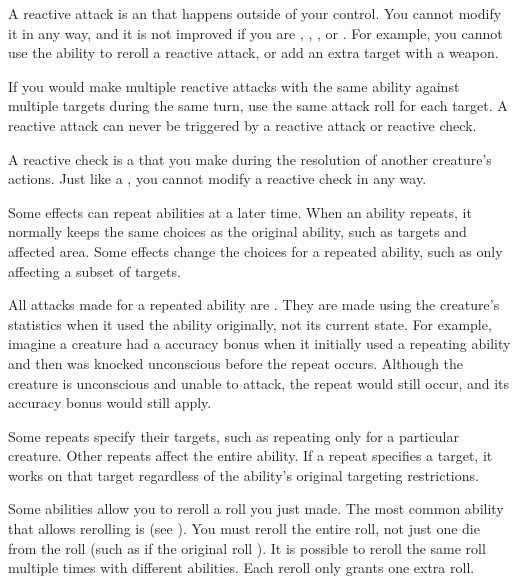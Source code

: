  A reactive attack is an  that happens outside of your control.
You cannot modify it in any way, and it is not improved if you are \empowered, \focused, \maximized, or \primed.
For example, you cannot use the  ability to reroll a reactive attack, or add an extra target with a  weapon.

If you would make multiple reactive attacks with the same ability against multiple targets during the same turn, use the same attack roll for each target.
A reactive attack can never be triggered by a reactive attack or reactive check.

 A reactive check is a  that you make during the resolution of another creature's actions.
Just like a , you cannot modify a reactive check in any way.

 Some effects can repeat abilities at a later time.
When an ability repeats, it normally keeps the same choices as the original ability, such as targets and affected area.
Some effects change the choices for a repeated ability, such as only affecting a subset of targets.

All attacks made for a repeated ability are .
They are made using the creature's statistics when it used the ability originally, not its current state.
For example, imagine a creature had a  accuracy bonus when it initially used a repeating ability and then was knocked unconscious before the repeat occurs.
Although the creature is unconscious and unable to attack, the repeat would still occur, and its accuracy bonus would still apply.

Some repeats specify their targets, such as repeating only for a particular creature.
Other repeats affect the entire ability.
If a repeat specifies a target, it works on that target regardless of the ability's original targeting restrictions.

 Some abilities allow you to reroll a roll you just made.
The most common ability that allows rerolling is  (see ).
You must reroll the entire roll, not just one die from the roll (such as if the original roll ).
It is possible to reroll the same roll multiple times with different abilities.
Each reroll only grants one extra roll.

